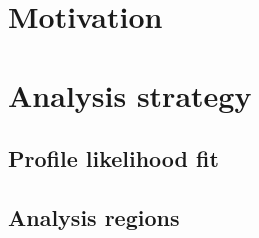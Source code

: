\documentclass[../thesis.tex]{subfiles}
\begin{document}
\vspace{-1\baselineskip}

\section{Motivation}
\label{sec:motivation}
\section{Analysis strategy}
\label{sec:strat}
\subsection{Profile likelihood fit}
\subsection{Analysis regions}
\end{document}

